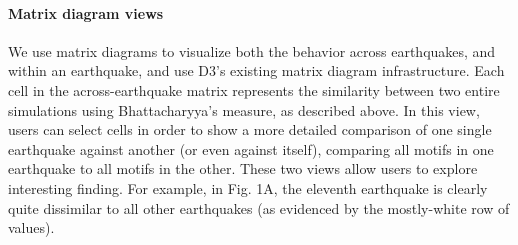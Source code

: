 \paragraph*{Matrix diagram views}
\label{matrixvis}
We use matrix diagrams to visualize both the behavior across earthquakes, and within an earthquake, and use D3's existing matrix diagram infrastructure. Each cell in the across-earthquake matrix represents the similarity between two entire simulations using Bhattacharyya's measure, as described above. In this view, users can select cells in order to show a more detailed comparison of one single earthquake against another (or even against itself), comparing all motifs in one earthquake to all motifs in the other. These two views allow users to explore interesting finding. For example, in Fig. 1A, the eleventh earthquake is clearly quite dissimilar to all other earthquakes (as evidenced by the mostly-white row of values).



